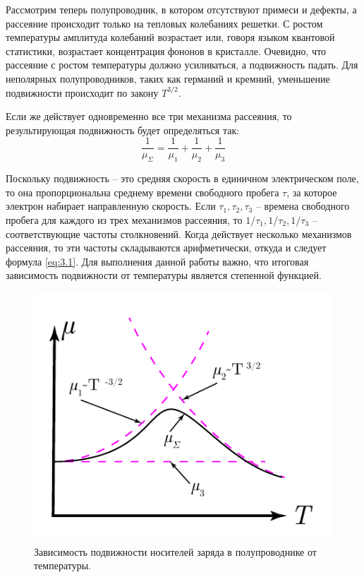 Рассмотрим теперь полупроводник, в котором отсутствуют примеси и дефекты, а рассеяние происходит только на тепловых
колебаниях решетки. С ростом температуры амплитуда колебаний возрастает или, говоря языком квантовой статистики,
возрастает концентрация фононов в кристалле. Очевидно, что рассеяние с ростом температуры должно усиливаться, а
подвижность падать. Для неполярных полупроводников, таких как германий и кремний, уменьшение подвижности происходит по
закону $T^{3/2}$. 

Если же действует одновременно все три механизма рассеяния, то результирующая подвижность будет определяться так: 
\begin{equation}
	\frac{1}{\mu_{\Sigma}} = \frac{1}{\mu_{1}}+\frac{1}{\mu_{2}}+\frac{1}{\mu_{3}}
	\label{eq:3.1}
\end{equation}

Поскольку подвижность – это средняя скорость в единичном электрическом поле, то она пропорциональна среднему времени
свободного пробега $\tau$, за которое электрон набирает направленную скорость. Если $\tau_1, \tau_2,\tau_3$ – времена свободного
пробега для каждого из трех механизмов рассеяния, то $1/\tau_1,1/\tau_2,1/\tau_3$ – соответствующие частоты столкновений. Когда
действует несколько механизмов рассеяния, то эти частоты складываются арифметически, откуда и следует формула \eqref{eq:3.1}. Для
выполнения данной работы важно, что итоговая зависимость подвижности от температуры является степенной функцией. 


\begin{figure}[h!]
	\centering
	\includegraphics[width = .5\linewidth]{img/32}
	\caption{Зависимость подвижности носителей заряда в полупроводнике от температуры.}
	\label{fig:3.2}
\end{figure}

